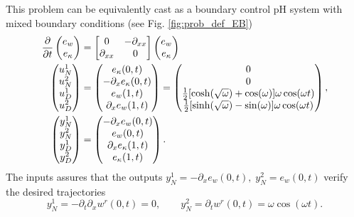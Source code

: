 This problem can be equivalently cast as a boundary control pH system with mixed boundary conditions (see Fig. \ref{fig:prob_def_EB})
\begin{subequations}
	\begin{align}
	\diffp{}{t}\begin{pmatrix}
	e_w \\ e_\kappa \\
	\end{pmatrix} &= \begin{bmatrix}
	0 & -\partial_{xx} \\
	\partial_{xx} & 0 \\
	\end{bmatrix} \begin{pmatrix}
	e_w \\ e_\kappa \\
	\end{pmatrix}  \\
	\begin{pmatrix}
	u_N^1 \\
	u_N^2 \\
	u_D^1 \\
	u_D^2 \\
	\end{pmatrix} &= \begin{pmatrix}
	e_\kappa(0, t) \\
	-\partial_x e_\kappa(0, t) \\
	e_w(1, t) \\
	\partial_x e_w(1,t) \\
	\end{pmatrix} = \begin{pmatrix}
	0 \\
	0 \\
	\frac{1}{2}[\cosh(\sqrt{\omega}) + \cos(\omega)]\omega \cos(\omega t) \\
	\frac{1}{2}[\sinh(\sqrt{\omega}) - \sin(\omega)]\omega \cos(\omega t) \\
	\end{pmatrix},  \\
	\begin{pmatrix}
	y_N^1 \\
	y_N^2 \\
	y_D^1 \\
	y_D^2 \\
	\end{pmatrix}  &= \begin{pmatrix}
	-\partial_x e_w(0, t) \\
	e_w(0, t) \\
	\partial_x e_\kappa(1, t) \\
	e_\kappa(1,t) \\
	\end{pmatrix}.
	\end{align}
\end{subequations}
The inputs assures that the outputs $y_{N}^1 = -\partial_x e_w(0, t), \; y_{N}^2 = e_w(0, t)$ verify the desired trajectories
$$ y_{N}^1 =  -\partial_t \partial_x w^r(0,t) = 0, \qquad y_{N}^2 = \partial_t w^r(0, t) = \omega \cos(\omega t).
$$

